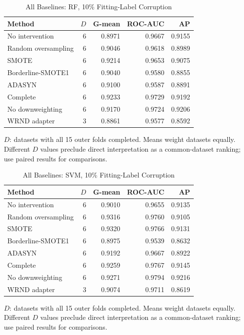 \begin{table}[t]
\caption{All Baselines: RF, 10\% Fitting-Label Corruption}
\label{tab:all_baselines_rf_10}
\centering\small
\begin{tabular}{lrrrr}
\hline
Method & $D$ & G-mean & ROC-AUC & AP\\
\hline
No intervention & 6 & 0.8971 & 0.9667 & 0.9155 \\
Random oversampling & 6 & 0.9046 & 0.9618 & 0.8989 \\
SMOTE & 6 & 0.9214 & 0.9653 & 0.9075 \\
Borderline-SMOTE1 & 6 & 0.9040 & 0.9580 & 0.8855 \\
ADASYN & 6 & 0.9100 & 0.9587 & 0.8891 \\
Complete & 6 & 0.9233 & 0.9729 & 0.9192 \\
No downweighting & 6 & 0.9170 & 0.9724 & 0.9206 \\
WRND adapter & 3 & 0.8861 & 0.9577 & 0.8592 \\
\hline
\end{tabular}
\par\smallskip\footnotesize $D$: datasets with all 15 outer folds completed. Means weight datasets equally. Different $D$ values preclude direct interpretation as a common-dataset ranking; use paired results for comparisons.
\end{table}

\begin{table}[t]
\caption{All Baselines: SVM, 10\% Fitting-Label Corruption}
\label{tab:all_baselines_svm_10}
\centering\small
\begin{tabular}{lrrrr}
\hline
Method & $D$ & G-mean & ROC-AUC & AP\\
\hline
No intervention & 6 & 0.9010 & 0.9655 & 0.9135 \\
Random oversampling & 6 & 0.9316 & 0.9760 & 0.9105 \\
SMOTE & 6 & 0.9320 & 0.9766 & 0.9131 \\
Borderline-SMOTE1 & 6 & 0.8975 & 0.9539 & 0.8632 \\
ADASYN & 6 & 0.9192 & 0.9667 & 0.8922 \\
Complete & 6 & 0.9259 & 0.9767 & 0.9145 \\
No downweighting & 6 & 0.9271 & 0.9794 & 0.9216 \\
WRND adapter & 3 & 0.9074 & 0.9711 & 0.8619 \\
\hline
\end{tabular}
\par\smallskip\footnotesize $D$: datasets with all 15 outer folds completed. Means weight datasets equally. Different $D$ values preclude direct interpretation as a common-dataset ranking; use paired results for comparisons.
\end{table}
